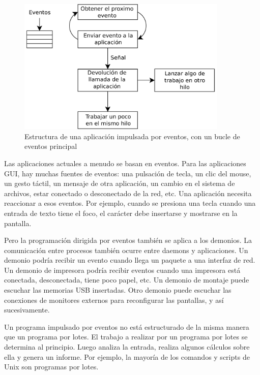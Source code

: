 \begin{figure}
  \begin{center}
    \includegraphics[width=10cm]{assets/img/event-loop.pdf}
    \caption{Estructura de una aplicación impulsada por eventos, con un bucle de eventos principal}
    \label{glib-event-loop}
  \end{center}
\end{figure}

Las aplicaciones actuales a menudo se basan en eventos. Para las aplicaciones GUI, hay muchas fuentes de eventos: una pulsación de tecla, un clic del mouse, un gesto táctil, un mensaje de otra aplicación, un cambio en el sistema de archivos, estar conectado o desconectado de la red, etc. Una aplicación necesita reaccionar a esos eventos. Por ejemplo, cuando se presiona una tecla cuando una entrada de texto tiene el foco, el carácter debe insertarse y mostrarse en la pantalla.

Pero la programación dirigida por eventos también se aplica a los demonios. La comunicación entre procesos también ocurre entre daemons y aplicaciones. Un demonio podría recibir un evento cuando llega un paquete a una interfaz de red. Un demonio de impresora podría recibir eventos cuando una impresora está conectada, desconectada, tiene poco papel, etc. Un demonio de montaje puede escuchar las memorias USB insertadas. Otro demonio puede escuchar las conexiones de monitores externos para reconfigurar las pantallas, y así sucesivamente.

Un programa impulsado por eventos no está estructurado de la misma manera que un programa por lotes. El trabajo a realizar por un programa por lotes se determina al principio. Luego analiza la entrada, realiza algunos cálculos sobre ella y genera un informe. Por ejemplo, la mayoría de los comandos y scripts de Unix son programas por lotes.


